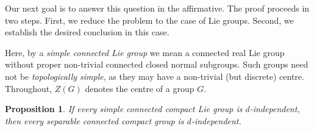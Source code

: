 \documentclass[12pt]{amsart}
\newtheorem{proposition}[theorem]{Proposition}
\theoremstyle{definition}
\theoremstyle{remark}
\begin{document}
Our next goal is to answer this question in the affirmative.
The proof proceeds in two steps.
First, we reduce the problem to the case of Lie groups.
Second, we establish the desired conclusion in this case.



Here, by a \emph{simple connected Lie group} we mean a connected real Lie group without
proper non-trivial connected closed normal subgroups.
Such groups need not be \emph{topologically simple}, as they may have a non-trivial
(but discrete) centre.
Throughout, $Z(G)$ denotes the centre of a group $G$.

\begin{proposition}\label{nonAb}
If every simple connected compact Lie group is $d$-independent,
then every separable connected compact group is $d$-independent.
\end{proposition}
\end{document}
